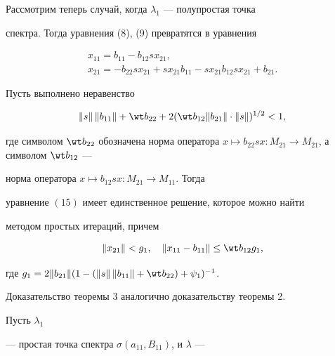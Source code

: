Рассмотрим теперь случай, когда $\lambda_1$ --- полупростая точка


спектра. Тогда уравнения (8), (9) превратятся в уравнения


\begin{gather}


x_{11}=b_{11}-b_{12}sx_{21},\\


x_{21}=-b_{22}sx_{21}+sx_{21}b_{11}-sx_{21}b_{12}sx_{21}+b_{21}.


\end{gather}








\begin{thm}


Пусть выполнено неравенство


\begin{equation}


\|s\|\,\|b_{11}\|+\wt b_{22}+2(\wt


b_{12}\|b_{21}\|\cdot\|s\|)^{1/2}<1,


\end{equation}


где символом $\wt b_{22}$ обозначена норма оператора $x\mapsto


b_{22}sx:M_{21}\to M_{21}$, а символом $\wt b_{12}$ ---


норма оператора $x\mapsto b_{12}sx:M_{21}\to M_{11}$. Тогда


уравнение $(15)$ имеет единственное решение, которое можно найти


методом простых итераций, причем


$$


\|x_{21}\|<g_1,\quad


\|x_{11}-b_{11}\|\le\wt b_{12}g_1,


$$


где $g_1=2\|b_{21}\|(1-(\|s\|\,\|b_{11}\|+\wt b_{22})+\psi_1)^{-1}$.


\end{thm}





Доказательство теоремы 3 аналогично доказательству теоремы 2.





Пусть $\lambda_1$


--- простая точка спектра $\sigma(a_{11},B_{11})$, и $\lambda$ ---


